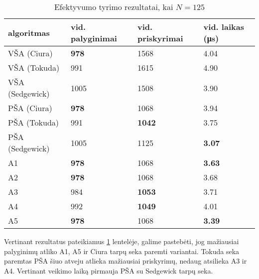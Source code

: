\documentclass{VUMIFInfKursinis}
\begin{document}
\begin{table}[H]
  \caption{Efektyvumo tyrimo rezultatai, kai $N = 125$}
  \label{results_125}
  \centering
  \begin{tabular}{@{}llll@{}}
  algoritmas & vid. palyginimai                     & vid. priskyrimai                      & vid. laikas (μs)                      \\ \midrule
  VŠA (Ciura)       & \cellcolor[HTML]{70AD47}\textbf{978} & 1568                                  & 4.04                                  \\
  VŠA (Tokuda)      & 991                                  & 1615                                  & 4.90                                  \\
  VŠA (Sedgewick)       & 1005                                 & 1508                                  & 3.90                                  \\
  PŠA (Ciura)      & \cellcolor[HTML]{70AD47}\textbf{978} & 1068                                  & 3.94                                  \\
  PŠA (Tokuda)      & 991                                  & \cellcolor[HTML]{70AD47}\textbf{1042} & 3.75                                  \\
  PŠA (Sedgewick)      & 1005                                 & 1125                                  & \cellcolor[HTML]{70AD47}\textbf{3.07} \\
  A1      & \cellcolor[HTML]{70AD47}\textbf{978} & 1068                                  & \cellcolor[HTML]{70AD47}\textbf{3.63} \\
  A2      & \cellcolor[HTML]{70AD47}\textbf{978} & 1068                                  & 3.68                                  \\
  A3      & 984                                  & \cellcolor[HTML]{70AD47}\textbf{1053} & 3.71                                  \\
  A4      & 992                                  & \cellcolor[HTML]{70AD47}\textbf{1049} & 4.01                                  \\
  A5      & \cellcolor[HTML]{70AD47}\textbf{978} & 1068                                  & \cellcolor[HTML]{70AD47}\textbf{3.39} \\ \bottomrule
  \end{tabular}
\end{table}

Vertinant rezultatus pateikiamus \ref{results_125} lentelėje, galime pastebėti, jog
mažiausiai palyginimų atliko A1, A5 ir Ciura tarpų seka paremti variantai.
Tokuda seka paremtas PŠA šiuo atveju atlieka mažiausiai priskyrimų, nedaug atsilieka A3 ir A4.
Vertinant veikimo laiką pirmauja PŠA su Sedgewick tarpų seka.
\end{document}
